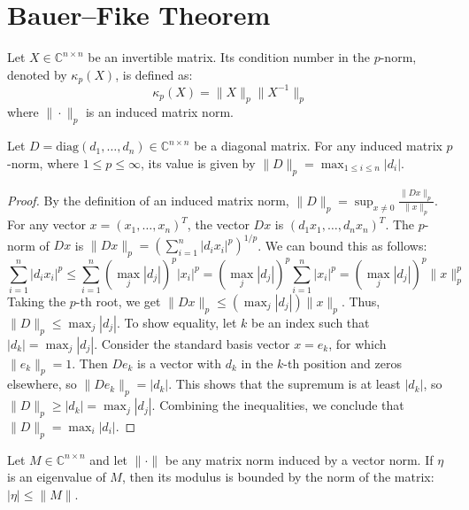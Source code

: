 \chapter{Bauer–Fike Theorem}

\begin{definition}
    \label{def:Condition_Number}
    Let $X \in \mathbb{C}^{n \times n}$ be an invertible matrix. Its condition number in the $p$-norm, denoted by $\kappa_p(X)$, is defined as:
    \[ \kappa_p(X) = \|X\|_p \|X^{-1}\|_p \]
    where $\|\cdot\|_p$ is an induced matrix norm.
\end{definition}

\begin{lemma}
    \label{lem:P_Norm_of_Diagonal_Matrix}
    Let $D = \text{diag}(d_1, \dots, d_n) \in \mathbb{C}^{n \times n}$ be a diagonal matrix. For any induced matrix $p$-norm, where $1 \le p \le \infty$, its value is given by $\|D\|_p = \max_{1 \le i \le n} |d_i|$.
\end{lemma}

\begin{proof}
    By the definition of an induced matrix norm, $\|D\|_p = \sup_{x \neq 0} \frac{\|Dx\|_p}{\|x\|_p}$.
    For any vector $x = (x_1, \dots, x_n)^T$, the vector $Dx$ is $(d_1x_1, \dots, d_nx_n)^T$.
    The $p$-norm of $Dx$ is $\|Dx\|_p = \left( \sum_{i=1}^n |d_i x_i|^p \right)^{1/p}$.
    We can bound this as follows:
    \[ \sum_{i=1}^n |d_i x_i|^p \le \sum_{i=1}^n (\max_{j} |d_j|)^p |x_i|^p = (\max_{j} |d_j|)^p \sum_{i=1}^n |x_i|^p = (\max_{j} |d_j|)^p \|x\|_p^p \]
    Taking the $p$-th root, we get $\|Dx\|_p \le (\max_{j} |d_j|) \|x\|_p$. Thus, $\|D\|_p \le \max_{j} |d_j|$.
    To show equality, let $k$ be an index such that $|d_k| = \max_{j} |d_j|$. Consider the standard basis vector $x = e_k$, for which $\|e_k\|_p = 1$.
    Then $De_k$ is a vector with $d_k$ in the $k$-th position and zeros elsewhere, so $\|De_k\|_p = |d_k|$.
    This shows that the supremum is at least $|d_k|$, so $\|D\|_p \ge |d_k| = \max_{j} |d_j|$.
    Combining the inequalities, we conclude that $\|D\|_p = \max_{i} |d_i|$.
\end{proof}

\begin{lemma}
    \label{lem:Eigenvalue_Bound_by_Norm}
    Let $M \in \mathbb{C}^{n \times n}$ and let $\|\cdot\|$ be any matrix norm induced by a vector norm. If $\eta$ is an eigenvalue of $M$, then its modulus is bounded by the norm of the matrix: $|\eta| \le \|M\|$.
\end{lemma}

